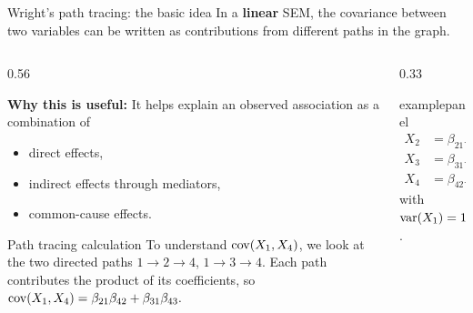 \documentclass[dvipsnames,aspectratio=169,handout]{beamer}
\begin{document}
\begin{frame}{Wright's path tracing: the basic idea}
In a \textbf{linear} SEM, the covariance between two variables can be written as contributions from different paths in the graph.

\begin{columns}[T]
\begin{column}{0.56\textwidth}

\begin{block}{}
\textbf{Why this is useful: }It helps explain an observed association as a combination of
\begin{itemize}
    \item direct effects,
    \item indirect effects through mediators,
    \item common-cause effects.
\end{itemize}
\end{block}
\vspace{-3mm}
\begin{alertblock}{Path tracing calculation}
To understand $\operatorname{cov}(X_1,X_4)$, we look at the two directed paths
$
1\to 2\to 4$, $1\to 3\to 4$.
Each path contributes the product of its coefficients, so\\[2mm]
\qquad\qquad$
\operatorname{cov}(X_1,X_4)
=
\beta_{21}\beta_{42}
+
\beta_{31}\beta_{43}.
$
\end{alertblock}
\end{column}
\begin{column}{0.33\textwidth}
\begin{beamercolorbox}[wd=\textwidth,sep=0pt]{examplepanel}
\[
\begin{aligned}
X_2 &= \beta_{21}X_1+\varepsilon_2,\\
X_3 &= \beta_{31}X_1+\varepsilon_3,\\
X_4 &= \beta_{42}X_2+\beta_{43}X_3+\varepsilon_4,
\end{aligned}
\]
with $\operatorname{var}(X_1)=1$.
\vspace{1mm}
\begin{center}
\end{center}
\end{beamercolorbox}
\end{column}
\end{columns}
\end{frame}
\end{document}
